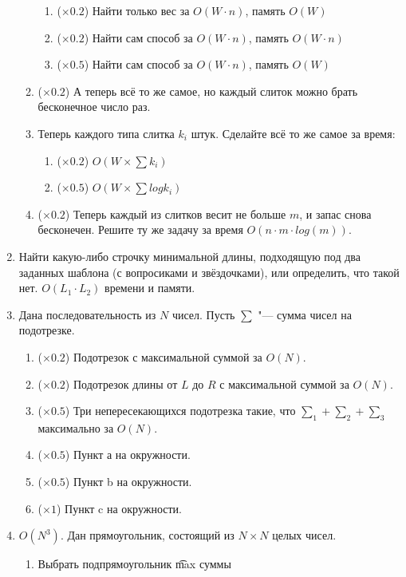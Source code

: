 \begin{enumerate}
\begin{enumerate}
\begin{enumerate}
        \item ($\times 0.2$) Найти только вес за $O(W \cdot n)$, память $O(W)$
        \item ($\times 0.2$) Найти сам способ за $O(W \cdot n)$, память $O(W \cdot n)$
        \item($\times 0.5$) Найти сам способ за $O(W \cdot n)$, память $O(W)$
    \end{enumerate}
    \item ($\times 0.2$) А теперь всё то же самое, 
    но каждый слиток можно брать бесконечное число раз.
    \item Теперь каждого типа слитка $k_i$ штук. 
    Сделайте всё то же самое за время:
    \begin{enumerate}
        \item ($\times 0.2$) $O(W \times \sum k_i)$
        \item ($\times 0.5$) $O(W \times \sum log k_i)$
    \end{enumerate}
    \item ($\times 0.2$) Теперь каждый из слитков весит 
    не больше $m$, и запас снова бесконечен. 
    Решите ту же задачу за время $O(n \cdot m \cdot log (m))$.
\end{enumerate}
\item
Найти какую-либо строчку минимальной длины, 
подходящую под два заданных шаблона (с вопросиками и звёздочками), 
или определить, что такой нет. $O(L_1 \cdot L_2)$ времени и памяти.
\item 
Дана последовательность из $N$ чисел.  Пусть $\sum$ "--- сумма чисел на подотрезке.
    \begin{enumerate}
    \item ($\times 0.2$) Подотрезок с максимальной суммой за $O(N)$.
    \item ($\times 0.2$) Подотрезок длины от $L$ до $R$ с максимальной суммой за $O(N)$. 
    \item ($\times 0.5$) Три непересекающихся подотрезка такие, что $\sum_1 + \sum_2 + \sum_3$ максимально за $O(N)$.
    \item ($\times 0.5$) Пункт а на окружности.
    \item ($\times 0.5$) Пункт b на окружности.
    \item ($\times 1$) Пункт c на окружности.
    \end{enumerate}
\item 
$O(N^3)$. Дан прямоугольник, состоящий из $N \times N$ целых чисел. 
    \begin{enumerate}
    \item Выбрать подпрямоугольник \t{max} суммы

\end{enumerate}
\end{enumerate}
